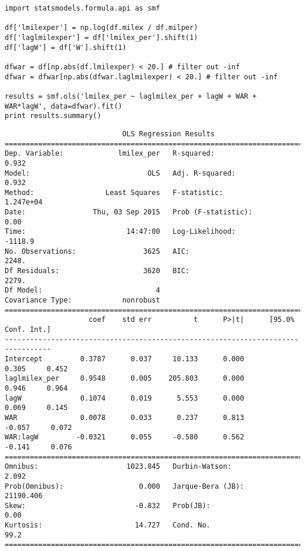 \documentclass[12pt,fleqn]{article}\usepackage{common}
\begin{document}
\begin{verbatim}
import statsmodels.formula.api as smf

df['lmilexper'] = np.log(df.milex / df.milper)
df['laglmilexper'] = df['lmilex_per'].shift(1)
df['lagW'] = df['W'].shift(1)

dfwar = df[np.abs(df.lmilexper) < 20.] # filter out -inf
dfwar = dfwar[np.abs(dfwar.laglmilexper) < 20.] # filter out -inf

results = smf.ols('lmilex_per ~ laglmilex_per + lagW + WAR + WAR*lagW', data=dfwar).fit()
print results.summary()
\end{verbatim}

\begin{verbatim}
                            OLS Regression Results                            
==============================================================================
Dep. Variable:             lmilex_per   R-squared:                       0.932
Model:                            OLS   Adj. R-squared:                  0.932
Method:                 Least Squares   F-statistic:                 1.247e+04
Date:                Thu, 03 Sep 2015   Prob (F-statistic):               0.00
Time:                        14:47:00   Log-Likelihood:                -1118.9
No. Observations:                3625   AIC:                             2248.
Df Residuals:                    3620   BIC:                             2279.
Df Model:                           4                                         
Covariance Type:            nonrobust                                         
=================================================================================
                    coef    std err          t      P>|t|      [95.0% Conf. Int.]
---------------------------------------------------------------------------------
Intercept         0.3787      0.037     10.133      0.000         0.305     0.452
laglmilex_per     0.9548      0.005    205.803      0.000         0.946     0.964
lagW              0.1074      0.019      5.553      0.000         0.069     0.145
WAR               0.0078      0.033      0.237      0.813        -0.057     0.072
WAR:lagW         -0.0321      0.055     -0.580      0.562        -0.141     0.076
==============================================================================
Omnibus:                     1023.845   Durbin-Watson:                   2.092
Prob(Omnibus):                  0.000   Jarque-Bera (JB):            21190.406
Skew:                          -0.832   Prob(JB):                         0.00
Kurtosis:                      14.727   Cond. No.                         99.2
==============================================================================

\end{verbatim}
\end{document}
